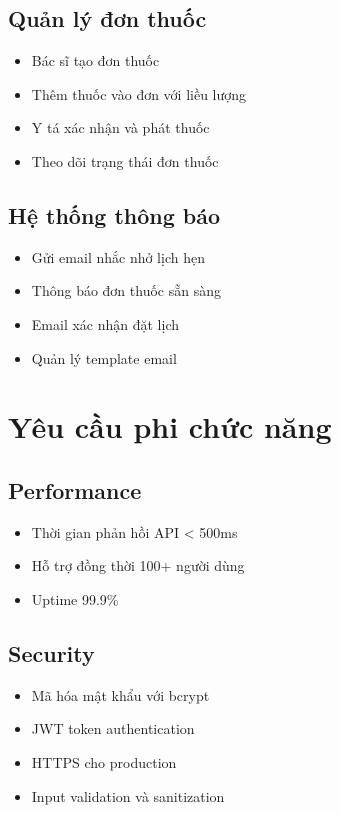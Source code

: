 \documentclass[12pt,a4paper]{report}
\begin{document}
\subsection{Quản lý đơn thuốc}
\begin{itemize}
    \item Bác sĩ tạo đơn thuốc
    \item Thêm thuốc vào đơn với liều lượng
    \item Y tá xác nhận và phát thuốc
    \item Theo dõi trạng thái đơn thuốc
\end{itemize}

\subsection{Hệ thống thông báo}
\begin{itemize}
    \item Gửi email nhắc nhở lịch hẹn
    \item Thông báo đơn thuốc sẵn sàng
    \item Email xác nhận đặt lịch
    \item Quản lý template email
\end{itemize}

\section{Yêu cầu phi chức năng}

\subsection{Performance}
\begin{itemize}
    \item Thời gian phản hồi API < 500ms
    \item Hỗ trợ đồng thời 100+ người dùng
    \item Uptime 99.9\%
\end{itemize}

\subsection{Security}
\begin{itemize}
    \item Mã hóa mật khẩu với bcrypt
    \item JWT token authentication
    \item HTTPS cho production
    \item Input validation và sanitization
\end{itemize}
\end{document}
